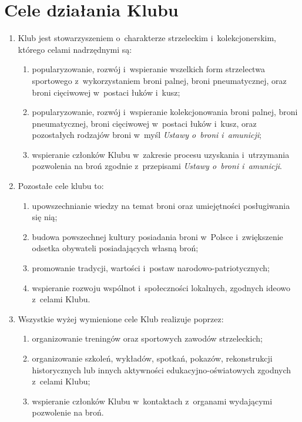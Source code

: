 \section{Cele działania Klubu}
\begin{enumerate}
    \item Klub jest stowarzyszeniem o~charakterze strzeleckim i~kolekcjonerskim, którego celami nadrzędnymi są:
    \begin{enumerate}
        \item popularyzowanie, rozwój i~wspieranie wszelkich form strzelectwa sportowego z~wykorzystaniem broni palnej, broni pneumatycznej, oraz broni cięciwowej w~postaci łuków i~kusz;
        \item popularyzowanie, rozwój i~wspieranie kolekcjonowania broni palnej, broni pneumatycznej, broni cięciwowej w~postaci łuków i~kusz, oraz pozostałych rodzajów broni w~myśl \textit{Ustawy o~broni i~amunicji};
        \item wspieranie członków Klubu w~zakresie procesu uzyskania i~utrzymania pozwolenia na broń zgodnie z~przepisami \textit{Ustawy o~broni i~amunicji}.
    \end{enumerate}
    \item Pozostałe cele klubu to:
    \begin{enumerate}
        \item upowszechnianie wiedzy na temat broni oraz umiejętności posługiwania się nią;
        \item budowa powszechnej kultury posiadania broni w~Polsce i~zwiększenie odsetka obywateli posiadających własną broń;
        \item promowanie tradycji, wartości i~postaw narodowo-patriotycznych;
        \item wspieranie rozwoju wspólnot i~społeczności lokalnych, zgodnych ideowo z~celami Klubu.
    \end{enumerate}
    \item Wszystkie wyżej wymienione cele Klub realizuje poprzez:
    \begin{enumerate}
        \item organizowanie treningów oraz sportowych zawodów strzeleckich;
        \item organizowanie szkoleń, wykładów, spotkań, pokazów, rekonstrukcji historycznych lub innych aktywności edukacyjno-oświatowych zgodnych z~celami Klubu;
        \item wspieranie członków Klubu w~kontaktach z~organami wydającymi pozwolenie na broń.
    \end{enumerate}
\end{enumerate}